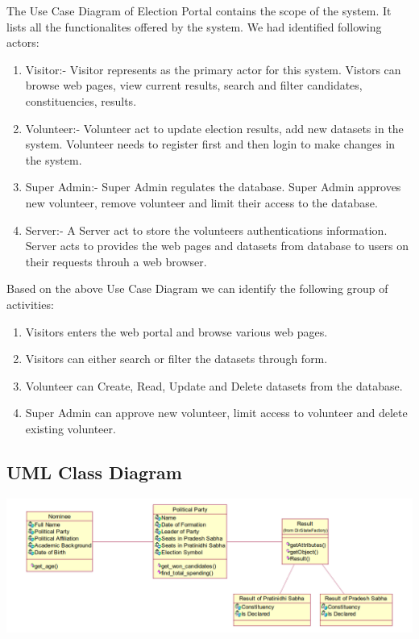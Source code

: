 \documentclass[12pt]{article}
\begin{document}
The Use Case Diagram of Election Portal contains the scope of the system. It lists all the functionalites offered by the system. We had identified following actors:
\begin{enumerate}
\item Visitor:- Visitor represents as the primary actor for this system. Vistors can browse web pages, view current results, search and filter candidates, constituencies, results.

\item Volunteer:- Volunteer act to update election results, add new datasets in the system. Volunteer needs to register first and then login to make changes in the system.

\item Super Admin:- Super Admin regulates the database. Super Admin approves new volunteer, remove volunteer and limit their access to the database.

\item Server:- A Server act to store the volunteers authentications information. Server acts to provides the web pages and datasets from database to users on their requests throuh a web browser. 
\end{enumerate}

Based on the above Use Case Diagram we can identify the following group of activities:

\begin{enumerate}
\item Visitors enters the web portal and browse various web pages.

\item Visitors can either search or filter the datasets through form.

\item Volunteer can Create, Read, Update and Delete datasets from the database.

\item Super Admin can approve new volunteer, limit access to volunteer and delete existing volunteer.
\end{enumerate}
\subsection{UML Class Diagram}
\begin{center}
\includegraphics[scale=0.5]{political_party.png}

\end{center}
\end{document}
